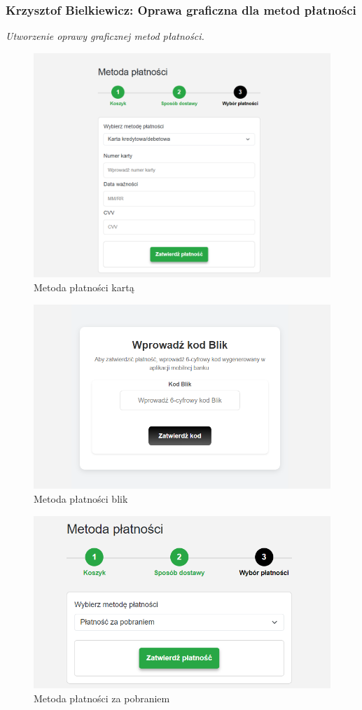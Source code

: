 \documentclass[12pt,a4paper,oneside]{article}
\theoremstyle{definition}
\numberwithin{equation}{section}
\begin{document}
\subsubsection{Krzysztof Bielkiewicz: Oprawa graficzna dla metod płatności}
\label{1.3.10}
\textit{Utworzenie oprawy graficznej metod płatności.}
\begin{figure}[H]
    \centering
    \includegraphics[width=0.8\columnwidth]{images/krzysztofBImages/cart/metody-płatności-karta.png}
    \caption{Metoda płatności kartą}
\end{figure}

\begin{figure}[H]
    \centering
    \includegraphics[width=1.0\columnwidth]{images/krzysztofBImages/cart/metody-płatności-blik.png}
    \caption{Metoda płatności blik}
\end{figure}

\begin{figure}[H]
    \centering
    \includegraphics[width=0.8\columnwidth]{images/krzysztofBImages/cart/metody-płatności-za-pobraniem.png}
    \caption{Metoda płatności za pobraniem}
\end{figure}
\end{document}
